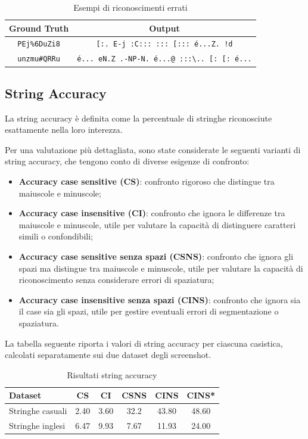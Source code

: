 \begin{table}[htbp]
    \centering
    \begin{tabular}{|c|c|}
        \hline
        \textbf{Ground Truth} & \textbf{Output} \\
        \hline
        \texttt{PEj\%6DuZi8} & \texttt{[:.\ E-j\ :C:::\ :::\ [:::\ é...Z.\ !d} \\
        \hline
        \texttt{unzmu\#QRRu} & \texttt{é...\ eN.Z\ .-NP-N.\ é...@\ :::\textbackslash..\ [:\ [:\ é...} \\
        \hline
    \end{tabular}
    \caption{Esempi di riconoscimenti errati}
    \label{tab:recognition_examples}
\end{table}

\subsection*{String Accuracy}
La string accuracy è definita come la percentuale di stringhe riconosciute esattamente nella loro interezza.

Per una valutazione più dettagliata, sono state considerate le seguenti varianti di string accuracy, che tengono conto di diverse esigenze di confronto:

\begin{itemize}
    \item \textbf{Accuracy case sensitive (CS)}: confronto rigoroso che distingue tra maiuscole e minuscole;
    \item \textbf{Accuracy case insensitive (CI)}: confronto che ignora le differenze tra maiuscole e minuscole, utile per valutare la capacità di distinguere caratteri simili o confondibili;
    \item \textbf{Accuracy case sensitive senza spazi (CSNS)}: confronto che ignora gli spazi ma distingue tra maiuscole e minuscole, utile per valutare la capacità di riconoscimento senza considerare errori di spaziatura;
    \item \textbf{Accuracy case insensitive senza spazi (CINS)}: confronto che ignora sia il case sia gli spazi, utile per gestire eventuali errori di segmentazione o spaziatura.

\end{itemize}

La tabella seguente riporta i valori di string accuracy per ciascuna casistica, calcolati separatamente sui due dataset degli screenshot.

\begin{table}[htbp]
    \centering
    \begin{tabular}{lccccc}
        \toprule
        Dataset & CS & CI & CSNS & CINS & CINS* \\
        \midrule
        Stringhe casuali & 2.40 & 3.60 & 32.2 & 43.80 & 48.60 \\
        Stringhe inglesi & 6.47 & 9.93 & 7.67 & 11.93 & 24.00 \\
        \bottomrule
    \end{tabular}
    \caption{Risultati string accuracy}
    \label{tab:string_accuracy_stats}
\end{table}

